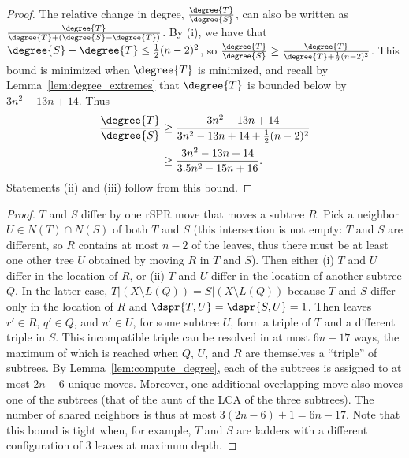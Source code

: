 \documentclass[10pt,twoside,leqno,twocolumn]{article}
\begin{document}
\begin{proof}
The relative change in degree, $\frac{\degree{T}}{\degree{S}}$, can also be written as $\frac{\degree{T}}{\degree{T} + (\degree{S} - \degree{T})}$.
By (i), we have that $\degree{S} - \degree{T} \le \frac{1}{2} (n-2)^2$,
so $\frac{\degree{T}}{\degree{S}} \ge \frac{\degree{T}}{\degree{T} + \frac{1}{2} (n-2)^2} $.
This bound is minimized when $\degree{T}$ is minimized, and recall by Lemma~\ref{lem:degree_extremes} that $\degree{T}$ is bounded below by $3n^2 - 13n + 14$.
	Thus
	\begin{align*}
		\frac{\degree{T}}{\degree{S}} &\ge \frac{3n^2 - 13n + 14}{3n^2 - 13n + 14 + \frac{1}{2}(n-2)^2} \\
		&\ge \frac{3n^2 - 13n + 14}{3.5n^2 - 15n + 16}.
	\end{align*}
	Statements (ii) and (iii) follow from this bound.

\end{proof}

\sharedneighbors*
\begin{proof}
	$T$ and $S$ differ by one rSPR move that moves a subtree $R$.
	Pick a neighbor $U \in N(T) \cap N(S)$ of both $T$ and $S$ (this intersection is not empty: $T$ and $S$ are different, so $R$ contains at most $n-2$ of the leaves, thus there must be at least one other tree $U$ obtained by moving $R$ in $T$ and $S$).
	Then either (i) $T$ and $U$ differ in the location of $R$, or (ii) $T$ and $U$ differ in the location of another subtree $Q$.
	In the latter case, $T|(X \setminus L(Q)) = S|(X \setminus L(Q))$ because $T$ and $S$ differ only in the location of $R$ and $\dspr{T,U} = \dspr{S,U} = 1$.
	Then leaves $r' \in R$, $q' \in Q$, and $u' \in U$, for some subtree $U$, form a triple of $T$ and a different triple in $S$.
	This incompatible triple can be resolved in at most $6n - 17$ ways, the maximum of which is reached when $Q$, $U$, and $R$ are themselves a ``triple'' of subtrees.
	By Lemma~\ref{lem:compute_degree}, each of the subtrees is assigned to at most $2n-6$ unique moves.
	Moreover, one additional overlapping move also moves one of the subtrees (that of the aunt of the LCA of the three subtrees).
	The number of shared neighbors is thus at most $3(2n-6) + 1 = 6n-17$.
	Note that this bound is tight when, for example, $T$ and $S$ are ladders with a different configuration of 3 leaves at maximum depth.
\end{proof}
\end{document}
